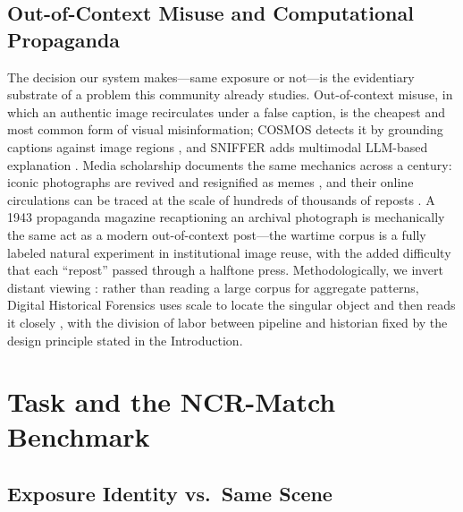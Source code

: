 \documentclass[letterpaper]{article} %
\begin{document}
\subsection{Out-of-Context Misuse and Computational Propaganda}
The decision our system makes---same exposure or not---is the evidentiary
substrate of a problem this community already studies. Out-of-context misuse,
in which an authentic image recirculates under a false caption, is the
cheapest and most common form of visual misinformation; COSMOS detects it by
grounding captions against image regions \cite{aneja2023cosmos}, and SNIFFER
adds multimodal LLM-based explanation \cite{qi2024sniffer}. Media scholarship
documents the same mechanics across a century: iconic photographs are revived
and resignified as memes \cite{boudana2017icons}, and their online
circulations can be traced at the scale of hundreds of thousands of reposts
\cite{smits2023iconic}. A 1943 propaganda magazine recaptioning an archival
photograph is mechanically the same act as a modern out-of-context post---the
wartime corpus is a fully labeled natural experiment in institutional image
reuse, with the added difficulty that each ``repost'' passed through a
halftone press. Methodologically, we invert distant viewing
\cite{arnold2019distant}: rather than reading a large corpus for aggregate
patterns, Digital Historical Forensics uses scale to locate the singular
object and then reads it closely \cite{du2026evidence}, with the division of
labor between pipeline and historian fixed by the design principle stated in
the Introduction.

\section{Task and the NCR-Match Benchmark}
\label{sec:task}

\subsection{Exposure Identity vs.\ Same Scene}
\end{document}
